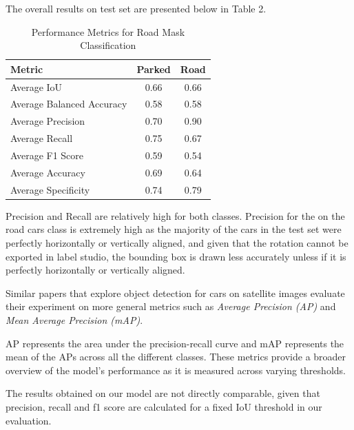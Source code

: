 \newpage{}


The overall results on test set are presented below in Table 2.

\begin{table}[htbp]
  \centering
  \begin{tabular}{|l|c|c|}
    \hline
    \textbf{Metric}           & \textbf{Parked} & \textbf{Road} \\ \hline
    Average IoU               & 0.66            & 0.66          \\ \hline
    Average Balanced Accuracy & 0.58            & 0.58          \\ \hline
    Average Precision         & 0.70            & 0.90          \\ \hline
    Average Recall            & 0.75            & 0.67          \\ \hline
    Average F1 Score          & 0.59            & 0.54          \\ \hline
    Average Accuracy          & 0.69            & 0.64          \\ \hline
    Average Specificity       & 0.74            & 0.79          \\ \hline
  \end{tabular}
  \caption{Performance Metrics for Road Mask Classification}
  \label{tab:metrics1}
\end{table}

Precision and Recall are relatively high for both classes. Precision for the on
the road cars class is extremely high as the majority of the cars in the test
set were perfectly horizontally or vertically aligned, and given that the
rotation cannot be exported in label studio, the bounding box is drawn less
accurately unless if it is perfectly horizontally or vertically aligned.

\newpage{}

Similar papers that explore object detection for cars on satellite images
evaluate their experiment on more general metrics such as \emph{Average
  Precision (AP)} and \emph{Mean Average Precision (mAP)}.

AP represents the area under the precision-recall curve and mAP represents the
mean of the APs across all the different classes. These metrics provide a
broader overview of the model's performance as it is measured across varying
thresholds.

The results obtained on our model are not directly comparable, given that
precision, recall and f1 score are calculated for a fixed IoU threshold in our
evaluation.

